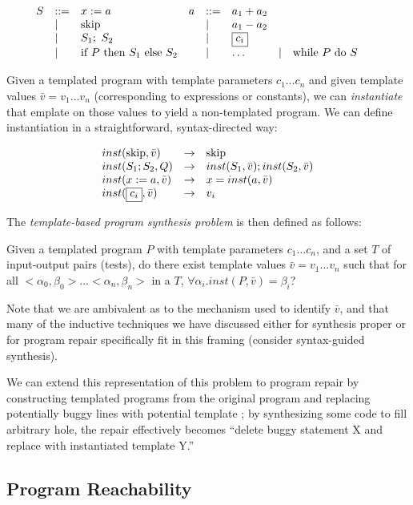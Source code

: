\documentclass[11pt]{article}
\begin{document}
\[
\begin{array}{llllllllllllll}

S & ::= & x := a    & a & ::= & a_1 + a_2 \\
  & \mathrel{\mid} & \mbox{skip}    &   & \mathrel{\mid} & a_1 - a_2 \\ 
  & \mathrel{\mid} & S_1;~ S_2 &   & \mathrel{\mid} & \fbox{$\displaystyle c_i $} \\
  & \mathrel{\mid} & \mbox{if}~ P ~\mbox{then}~ S_1 ~\mbox{else}~ S_2      &   & \mathrel{\mid} & \ldots
  & \mathrel{\mid} & \mbox{while}~ P ~\mbox{do}~ S   &   & \\
\end{array}
\]


Given a templated program with template parameters $c_1 \ldots c_n$ and given
template values $\bar{v} = v_1 \ldots v_n$ (corresponding to expressions or
constants), we can \emph{instantiate} that emplate on those values to yield a
non-templated program.  We can define instantiation in a straightforward,
syntax-directed way:

\begin{center}
\[
\begin{array}{lcl}
inst(\mbox{skip}, \bar{v}) & \rightarrow & \mbox{skip} \\
inst(S_1; S_2, Q) & \rightarrow & inst(S_1, \bar{v}); inst(S_2, \bar{v}) \\
inst(x := a, \bar{v}) & \rightarrow & x = inst(a, \bar{v}) \\
inst(\fbox{$\displaystyle c_i $}, \bar{v}) & \rightarrow & v_i 
\end{array}
\]
\end{center}

The \emph{template-based program synthesis problem} is then defined as follows: 
\begin{blockquote}
  Given a templated program $P$ with template parameters $c_1\ldots c_n$, and a
  set $T$ of input-output pairs (tests), do there exist template values
  $\bar{v}=v_1 \ldots v_n$ such that for all
  ${ < \alpha_0, \beta_0 > \ldots < \alpha_n, \beta_n > }$ in a $T$,
  $\forall \alpha_i. inst(P,\bar{v}) = \beta_i$?
\end{blockquote}

Note that we are ambivalent as to the mechanism used to identify $\bar{v}$, and
that many of the inductive techniques we have discussed either for synthesis
proper or for program repair specifically fit in this framing (consider
syntax-guided synthesis). 

We can extend this representation of this problem to program repair by
constructing templated programs from the original program and replacing
potentially buggy lines with potential template ; by
synthesizing some code to fill arbitrary hole, the repair effectively becomes
``delete buggy statement X and replace with instantiated template Y.'' 


\subsection{Program Reachability}




\end{document}
